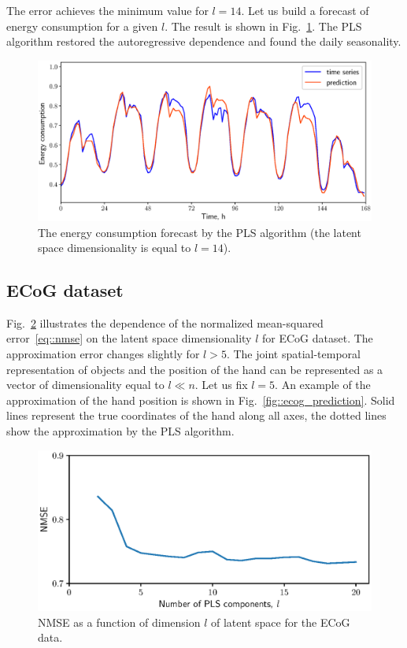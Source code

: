 \documentclass[runningheads]{llncs}
\begin{document}
The error achieves the minimum value for $l=14$. 
Let us build a forecast of energy consumption for a given $l$. 
The result is shown in Fig.~\ref{fig::energy_prediction}. 
The PLS algorithm restored the autoregressive dependence and found the daily seasonality.

\begin{figure}[!h]
	\centering
	\includegraphics[width=1.\textwidth]{figs/energy_prediction}
	\caption{The energy consumption forecast by the PLS algorithm (the latent space dimensionality is equal to $l=14$).}
	\label{fig::energy_prediction}
\end{figure}

\subsection{ECoG dataset}
Fig.~\ref{fig::ecog_n_comp} illustrates the dependence of the normalized mean-squared error~\eqref{eq::nmse} on the latent space dimensionality $l$ for ECoG dataset. 
The approximation error changes slightly for $l > 5$.
The joint spatial-temporal representation of objects and the position of the hand can be represented as a vector of dimensionality equal to $l \ll n$.
Let us fix $l = 5$. 
An example of the approximation of the hand position is shown in Fig.~\ref{fig::ecog_prediction}. 
Solid lines represent the true coordinates of the hand along all axes, the dotted lines show the approximation by the PLS algorithm.
 
\begin{figure}[!h]
	\centering
	\includegraphics[width=0.8\linewidth]{figs/ecog_n_comp}	
	\caption{NMSE as a function of dimension $l$ of latent space for the ECoG data.}
	\label{fig::ecog_n_comp}
\end{figure}
\end{document}
